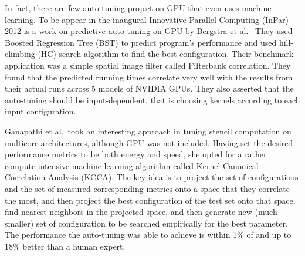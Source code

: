 In fact, there are few auto-tuning project on GPU that even uses machine learning. To be appear in the inaugural Innovative Parallel Computing (InPar) 2012 is a work on predictive auto-tuning on GPU by Bergstra et al.\ \cite{inpar2012} They used Boosted Regression Tree (BST) to predict program's performance and used hill-climbing (HC) search algorithm to find the best configuration. Their benchmark application was a simple spatial image filter called Filterbank correlation. They found that the predicted running times correlate very well with the results from their actual runs across 5 models of NVIDIA GPUs. They also asserted that the auto-tuning should be input-dependent, that is choosing kernels according to each input configuration.

Ganapathi et al.\ took an interesting approach in tuning stencil computation on multicore architectures, although GPU was not included. \cite{KCCA} Having set the desired performance metrics to be both energy and speed, she opted for a rather compute-intensive machine learning algorithm called Kernel Canonical Correlation Analysis (KCCA). The key idea is to project the set of configurations and the set of measured corresponding metrics onto a space that they correlate the most, and then project the best configuration of the test set onto that space, find nearest neighbors in the projected space, and then generate new (much smaller) set of configuration to be searched empirically for the best parameter. The performance the auto-tuning was able to achieve is within 1\% of and up to 18\% better than a human expert.

